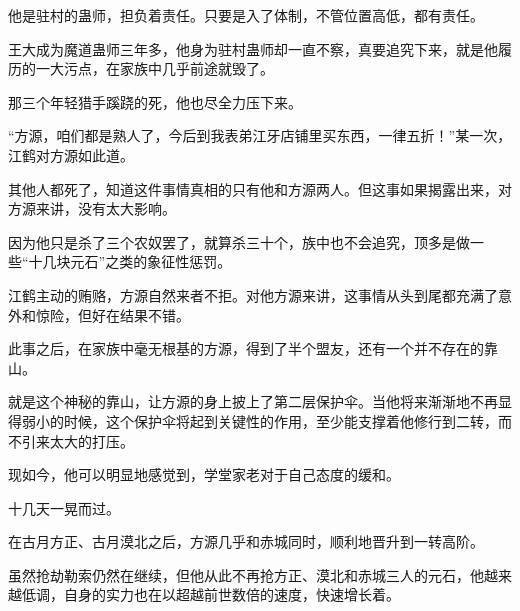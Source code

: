 \begin{this_body}
他是驻村的蛊师，担负着责任。只要是入了体制，不管位置高低，都有责任。

王大成为魔道蛊师三年多，他身为驻村蛊师却一直不察，真要追究下来，就是他履历的一大污点，在家族中几乎前途就毁了。

那三个年轻猎手蹊跷的死，他也尽全力压下来。

“方源，咱们都是熟人了，今后到我表弟江牙店铺里买东西，一律五折！”某一次，江鹤对方源如此道。

其他人都死了，知道这件事情真相的只有他和方源两人。但这事如果揭露出来，对方源来讲，没有太大影响。

因为他只是杀了三个农奴罢了，就算杀三十个，族中也不会追究，顶多是做一些“十几块元石”之类的象征性惩罚。

江鹤主动的贿赂，方源自然来者不拒。对他方源来讲，这事情从头到尾都充满了意外和惊险，但好在结果不错。

此事之后，在家族中毫无根基的方源，得到了半个盟友，还有一个并不存在的靠山。

就是这个神秘的靠山，让方源的身上披上了第二层保护伞。当他将来渐渐地不再显得弱小的时候，这个保护伞将起到关键性的作用，至少能支撑着他修行到二转，而不引来太大的打压。

现如今，他可以明显地感觉到，学堂家老对于自己态度的缓和。

十几天一晃而过。

在古月方正、古月漠北之后，方源几乎和赤城同时，顺利地晋升到一转高阶。

虽然抢劫勒索仍然在继续，但他从此不再抢方正、漠北和赤城三人的元石，他越来越低调，自身的实力也在以超越前世数倍的速度，快速增长着。

\end{this_body}

